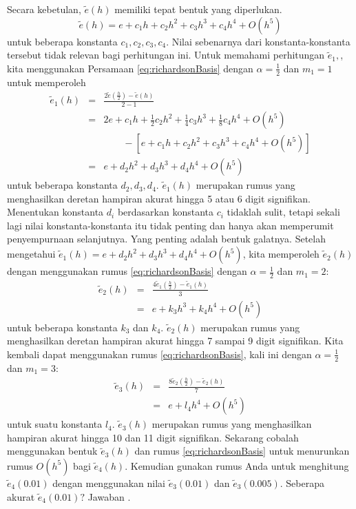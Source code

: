 Secara kebetulan, $\tilde{e}(h)$ memiliki tepat bentuk yang diperlukan.
\begin{equation}
\tilde{e}(h)=e+c_{1}h+c_{2}h^{2}+c_{3}h^{3}+c_{4}h^{4}+O(h^{5})\label{eq:eErrorForm}
\end{equation}
untuk beberapa konstanta $c_{1},c_{2},c_{3},c_{4}$. Nilai sebenarnya
dari konstanta-konstanta tersebut tidak relevan bagi perhitungan ini.
Untuk memahami perhitungan $\tilde{e}_{1},$, kita menggunakan Persamaan
\ref{eq:richardsonBasis} dengan $\alpha=\frac{1}{2}$ dan $m_{1}=1$
untuk memperoleh
\begin{eqnarray*}
\tilde{e}_{1}(h) & = & \frac{2\tilde{e}\left(\frac{h}{2}\right)-\tilde{e}(h)}{2-1}\\
 & = & 2e+c_{1}h+\frac{1}{2}c_{2}h^{2}+\frac{1}{4}c_{3}h^{3}+\frac{1}{8}c_{4}h^{4}+O(h^{5})\\
 &  & \qquad-\left[e+c_{1}h+c_{2}h^{2}+c_{3}h^{3}+c_{4}h^{4}+O(h^{5})\right]\\
 & = & e+d_{2}h^{2}+d_{3}h^{3}+d_{4}h^{4}+O(h^{5})
\end{eqnarray*}
untuk beberapa konstanta $d_{2},d_{3},d_{4}$. $\tilde{e}_{1}(h)$
merupakan rumus yang menghasilkan deretan hampiran akurat hingga 5
atau 6 digit signifikan. Menentukan konstanta $d_{i}$ berdasarkan
konstanta $c_{i}$ tidaklah sulit, tetapi sekali lagi nilai konstanta-konstanta
itu tidak penting dan hanya akan memperumit penyempurnaan selanjutnya.
Yang penting adalah bentuk galatnya. Setelah mengetahui $\tilde{e}_{1}(h)=e+d_{2}h^{2}+d_{3}h^{3}+d_{4}h^{4}+O(h^{5})$,
kita memperoleh $\tilde{e}_{2}(h)$ dengan menggunakan rumus \ref{eq:richardsonBasis}
dengan $\alpha=\frac{1}{2}$ dan $m_{1}=2$:
\begin{eqnarray*}
\tilde{e}_{2}(h) & = & \frac{4\tilde{e}_{1}\left(\frac{h}{2}\right)-\tilde{e}_{1}(h)}{3}\\
 & = & e+k_{3}h^{3}+k_{4}h^{4}+O(h^{5})
\end{eqnarray*}
untuk beberapa konstanta $k_{3}$ dan $k_{4}$. $\tilde{e}_{2}(h)$
merupakan rumus yang menghasilkan deretan hampiran akurat hingga 7
sampai 9 digit signifikan. Kita kembali dapat menggunakan rumus \ref{eq:richardsonBasis},
kali ini dengan $\alpha=\frac{1}{2}$ dan $m_{1}=3$:
\begin{eqnarray*}
\tilde{e}_{3}(h) & = & \frac{8\tilde{e}_{2}\left(\frac{h}{2}\right)-\tilde{e}_{2}(h)}{7}\\
 & = & e+l_{4}h^{4}+O(h^{5})
\end{eqnarray*}
untuk suatu konstanta $l_{4}$. $\tilde{e}_{3}(h)$ merupakan rumus
yang menghasilkan hampiran akurat hingga 10 dan 11 digit signifikan.
Sekarang cobalah menggunakan bentuk $\tilde{e}_{3}(h)$ dan rumus
\ref{eq:richardsonBasis} untuk menurunkan rumus $O(h^{5})$ bagi
$\tilde{e}_{4}(h)$. Kemudian gunakan rumus Anda untuk menghitung
$\tilde{e}_{4}(0.01)$ dengan menggunakan nilai $\tilde{e}_{3}(0.01)$
dan $\tilde{e}_{3}(0.005)$. Seberapa akurat $\tilde{e}_{4}(0.01)?$
Jawaban .


